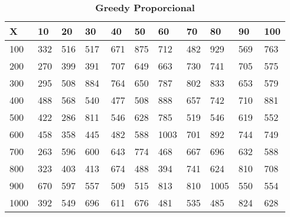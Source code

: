 \documentclass[10pt,letterpaper]{article}
\begin{document}
\begin{center}
\begin{table}\renewcommand{\arraystretch}{2.5}
\caption{\large \textbf{Greedy Proporcional}}
\centering
\begin{tabular} { |m{0.5cm}|m{1.3cm}|m{1.3cm}|m{1.3cm}|m{1.3cm}|m{1.3cm}|m{1.3cm}|m{1.3cm}|m{1.3cm}|m{1.3cm}|m{1.3cm}|} 
\hline
\rowcolor{Gray}
\centering \textbf{X} & \centering \textbf{10} & \centering \textbf{20} & \centering \textbf{30}\ & \centering \textbf{40} & \centering \textbf{50} & \centering \textbf{60}\ & \centering \textbf{70} & \centering \textbf{80} & \centering \textbf{90}\ & \textbf{100} \\\hline
\cellcolor{Gray}100 & \Large 332 & \Large 516 & \Large 517 & \Large 671 & \Large 875 & \Large 712 & \Large 482 & \Large 929 & \Large 569 & \Large 763 \\
\hline
\cellcolor{Gray}200 & \Large 270 & \Large 399 & \Large 391 & \Large 707 & \Large 649 & \Large 663 & \Large 730 & \Large 741 & \Large 705 & \Large 575 \\
\hline
\cellcolor{Gray}300 & \Large 295 & \Large 508 & \Large 884 & \Large 764 & \Large 650 & \Large 787 & \Large 802 & \Large 833 & \Large 653 & \Large 579 \\
\hline
\cellcolor{Gray}400 & \Large 488 & \Large 568 & \Large 540 & \Large 477 & \Large 508 & \Large 888 & \Large 657 & \Large 742 & \Large 710 & \Large 881 \\
\hline
\cellcolor{Gray}500 & \Large 422 & \Large 286 & \Large 811 & \Large 546 & \Large 628 & \Large 785 & \Large 519 & \Large 546 & \Large 619 & \Large 552 \\
\hline
\cellcolor{Gray}600 & \Large 458 & \Large 358 & \Large 445 & \Large 482 & \Large 588 & \Large 1003 & \Large 701 & \Large 892 & \Large 744 & \Large 749 \\
\hline
\cellcolor{Gray}700 & \Large 263 & \Large 596 & \Large 600 & \Large 643 & \Large 774 & \Large 468 & \Large 667 & \Large 696 & \Large 632 & \Large 588 \\
\hline
\cellcolor{Gray}800 & \Large 323 & \Large 403 & \Large 413 & \Large 674 & \Large 488 & \Large 394 & \Large 741 & \Large 624 & \Large 810 & \Large 708 \\
\hline
\cellcolor{Gray}900 & \Large 670 & \Large 597 & \Large 557 & \Large 509 & \Large 515 & \Large 813 & \Large 810 & \Large 1005 & \Large 550 & \Large 554 \\
\hline
\cellcolor{Gray}1000 & \Large 392 & \Large 549 & \Large 696 & \Large 611 & \Large 676 & \Large 481 & \Large 535 & \Large 485 & \Large 824 & \Large 628 \\
\hline
\end{tabular} \\
\end{table}
\end{center}
\end{document}
